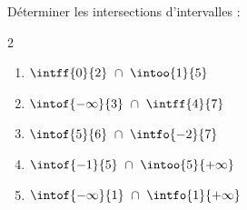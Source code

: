 \begin{exo}{}
	Déterminer les intersections d'intervalles :
	\vspace*{-2mm}\begin{multicols}{2}
	\begin{enumerate}[label=\alph*), itemsep=6pt]
		\item $\intff{0}{2} ~\cap~ \intoo{1}{5}$
		\item $\intof{-\infty}{3} ~\cap~ \intff{4}{7}$
		\item $\intof{5}{6} ~\cap~ \intfo{-2}{7}$
		\item $\intof{-1}{5} ~\cap~ \intoo{5}{+\infty}$
		\item $\intof{-\infty}{1} ~\cap~ \intfo{1}{+\infty}$
	\end{enumerate}
	\end{multicols}\vspace*{-2mm}
\end{exo}
